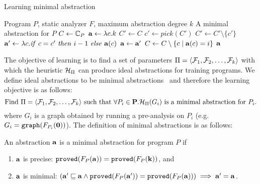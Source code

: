 \begin{algorithm}[t]
	\caption{Learning minimal abstraction}\label{alg:Learnminimal}
	\begin{algorithmic}[1]
		\Require Program $P$, static analyzer $F$, maximum abstraction degree $k$
		\Ensure A minimal abstraction for $P$
		\State
		$C \gets \mathbb{C}_{P}$
		\State
		${\bf a} \gets \lambda c. k$
		\State
		$C' \gets C$
			\State
			$c' \gets pick(C')$
			\State
			$C' \gets C' \setminus \{c'\}$
			\State
			${\bf a}' \gets \lambda c. {\it if}~c=c'~{\it then}~i-1~{\it else}~{\bf a}(c)$
				\State
				${\bf a} \gets {\bf a}'$
			\EndIf
		\EndWhile
		\State
		$C \gets C \setminus \{c \mid {\bf a}(c) = i\}$
		\EndFor
		\State \Return ${\bf a}$
		\EndProcedure
	\end{algorithmic}
\end{algorithm}



The objective of learning is to find a set of parameters $\Pi=\langle \mathcal{F}_1,\mathcal{F}_2, \dots, \mathcal{F}_k \rangle$ with which the heuristic $\mathcal{H}_\Pi$ can produce ideal abstractions for training programs.
We define ideal abstractions to be minimal abstractions~\cite{Liang2011learning} and therefore the learning objective is as follows:
\[
\mbox{Find $\Pi = \langle \mathcal{F}_1, \mathcal{F}_2,\dots,\mathcal{F}_k \rangle$
 such that $\forall P_i \in \mathbf{P}. \mathcal{H}_\Pi(G_i)$ is a minimal abstraction for $P_i$.}
\]
where $G_i$ is a graph obtained by running a pre-analysis on $P_i$ (e.g. $G_i = {\tt graph}(F_{P_i}({\bf 0}))$).
The definition of minimal abstractions is as follows:
\begin{definition}\label{def:minimalAbs}
An abstraction ${\bf a}$ is a minimal abstraction for program $P$ if
\begin{enumerate}
\item ${\bf a}$ is precise: ${{\tt proved}}(F_P({\bf a})) = {
    {\tt proved}}(F_P({\bf k}))$, and
\item ${\bf a}$ is minimal: $({\bf a}'\sqsubseteq {\bf a} \land {{\tt proved}}(F_P({\bf a}')) = {
    {\tt proved}}(F_P({\bf a}))) \implies {\bf a}' = {\bf a}$.
\end{enumerate}
\end{definition}




